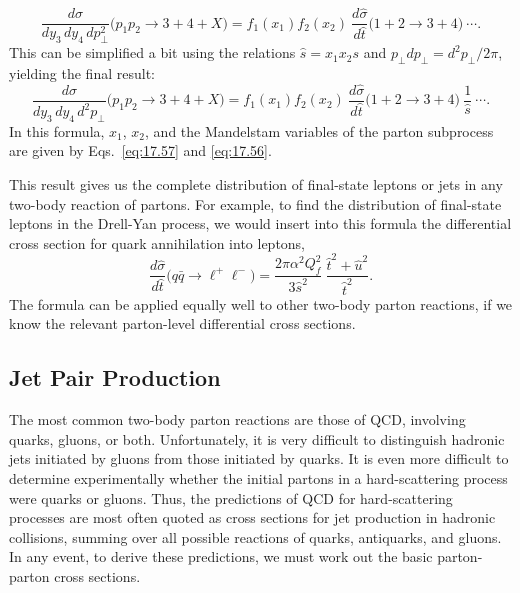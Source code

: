 \begin{equation}
  \frac{d\sigma}{dy_3\,dy_4\,dp_\perp^2}\bigl( p_1p_2 \to 3+4+X \bigr)
  = f_1(x_1)f_2(x_2)\ \frac{d\hat{\sigma}}{d\hat{t}}\bigl( 1+2 \to 3+4
    \bigr)\ \cdots .
  \label{eq:17.59}
\end{equation}
This can be simplified a bit using the relations $\hat{s} = x_1x_2s$ and
$p_\perp dp_\perp = d^2p_\perp/2\pi$, yielding the final result:
\begin{equation}
  \frac{d\sigma}{dy_3\,dy_4\,d^2p_\perp}\bigl( p_1p_2 \to 3+4+X \bigr)
  = f_1(x_1)f_2(x_2)\ \frac{d\hat{\sigma}}{d\hat{t}}\bigl( 1+2 \to 3+4
    \bigr)\ \frac{1}{\hat{s}}\ \cdots .
  \label{eq:17.60}
\end{equation}
In this formula, $x_1$, $x_2$, and the Mandelstam variables of the parton
subprocess are given by Eqs.~\eqref{eq:17.57} and \eqref{eq:17.56}.

This result gives us the complete distribution of final-state leptons or jets
in any two-body reaction of partons.  For example, to find the distribution
of final-state leptons in the Drell-Yan process, we would insert into this
formula the differential cross section for quark annihilation into leptons,
\begin{equation}
  \frac{d\hat{\sigma}}{d\hat{t}}\bigl( q\bar{q} \to \ell^{+}\ell^{-} \bigr)
  = \frac{2\pi\alpha^2 Q_f^2}{3\hat{s}^2}\ \frac{\hat{t}^2 + \hat{u}^2}
    {\hat{t}^2} .
  \label{eq:17.61}
\end{equation}
The formula can be applied equally well to other two-body parton reactions,
if we know the relevant parton-level differential cross sections.

\subsection{Jet Pair Production}

The most common two-body parton reactions are those of QCD, involving
quarks, gluons, or both.  Unfortunately, it is very difficult to distinguish
hadronic jets initiated by gluons from those initiated by quarks.  It is even
more difficult to determine experimentally whether the initial partons in a
hard-scattering process were quarks or gluons.  Thus, the predictions of QCD
for hard-scattering processes are most often quoted as cross sections for jet
production in hadronic collisions, summing over all possible reactions of
quarks, antiquarks, and gluons.  In any event, to derive these predictions,
we must work out the basic parton-parton cross sections.

